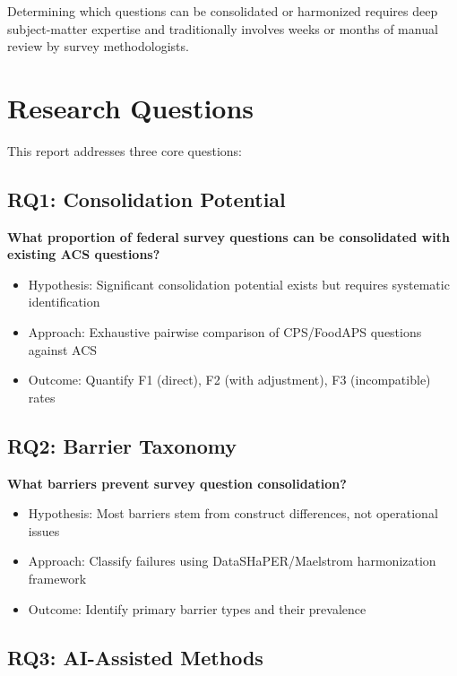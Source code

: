 \documentclass[
  letterpaper,
]{report}
\providecommand{\tightlist}{%
  \setlength{\itemsep}{0pt}\setlength{\parskip}{0pt}}
\begin{document}
Determining which questions can be consolidated or harmonized requires
deep subject-matter expertise and traditionally involves weeks or months
of manual review by survey methodologists.

\section{Research Questions}\label{research-questions}

This report addresses three core questions:

\subsection{RQ1: Consolidation
Potential}\label{rq1-consolidation-potential}

\textbf{What proportion of federal survey questions can be consolidated
with existing ACS questions?}

\begin{itemize}
\tightlist
\item
  Hypothesis: Significant consolidation potential exists but requires
  systematic identification
\item
  Approach: Exhaustive pairwise comparison of CPS/FoodAPS questions
  against ACS
\item
  Outcome: Quantify F1 (direct), F2 (with adjustment), F3 (incompatible)
  rates
\end{itemize}

\subsection{RQ2: Barrier Taxonomy}\label{rq2-barrier-taxonomy}

\textbf{What barriers prevent survey question consolidation?}

\begin{itemize}
\tightlist
\item
  Hypothesis: Most barriers stem from construct differences, not
  operational issues
\item
  Approach: Classify failures using DataSHaPER/Maelstrom harmonization
  framework
\item
  Outcome: Identify primary barrier types and their prevalence
\end{itemize}

\subsection{RQ3: AI-Assisted Methods}\label{rq3-ai-assisted-methods}
\end{document}
